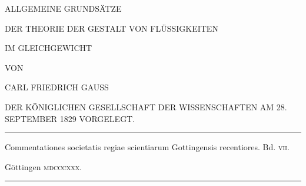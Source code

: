 \clearpage
\thispagestyle{empty}
\begin{center}
\vspace*{.7in}
{\large ALLGEMEINE GRUNDSÄTZE\par}
\bigskip
{\Large DER THEORIE DER GESTALT VON FLÜSSIGKEITEN\par}
\bigskip
{\Large IM GLEICHGEWICHT\par}
\vspace{.6in}
{\small VON\par}
\bigskip
CARL FRIEDRICH GAUSS\par
\bigskip
{\small DER KÖNIGLICHEN GESELLSCHAFT DER WISSENSCHAFTEN AM 28. SEPTEMBER 1829 VORGELEGT.\par}
\vfill
\rule{.8\textwidth}{.3pt}\par
\medskip
{\small Commentationes societatis regiae scientiarum Gottingensis recentiores. Bd. \textsc{vii}.\par}
Göttingen \textsc{mdcccxxx}.\par
\medskip
\rule{.8\textwidth}{.3pt}\par
\end{center}
\clearpage
